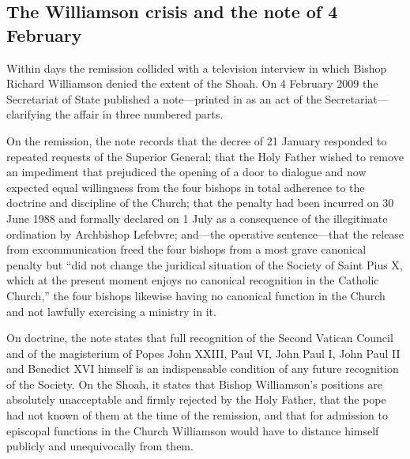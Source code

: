 
\subsection{The Williamson crisis and the note of 4 February}

Within days the remission collided with a television interview in which
Bishop Richard Williamson denied the extent of the Shoah. On 4 February
2009 the Secretariat of State published a note---printed in  as an act of the Secretariat---clarifying the affair in
three numbered parts.

On the remission, the note records that the decree of 21 January
responded to repeated requests of the Superior General; that the Holy
Father wished to remove an impediment that prejudiced the opening of a
door to dialogue and now expected equal willingness from the four bishops
in total adherence to the doctrine and discipline of the Church; that the
penalty had been incurred on 30 June 1988 and formally declared on 1 July
as a consequence of the illegitimate ordination by Archbishop Lefebvre;
and---the operative sentence---that the release from excommunication
freed the four bishops from a most grave canonical penalty but ``did not
change the juridical situation of the Society of Saint Pius X, which at
the present moment enjoys no canonical recognition in the Catholic
Church,'' the four bishops likewise having no canonical function in the
Church and not lawfully exercising a ministry in it.

On doctrine, the note states that full recognition of the Second Vatican
Council and of the magisterium of Popes John XXIII, Paul VI, John Paul I,
John Paul II and Benedict XVI himself is an indispensable condition of
any future recognition of the Society. On the Shoah, it states that
Bishop Williamson's positions are absolutely unacceptable and firmly
rejected by the Holy Father, that the pope had not known of them at the
time of the remission, and that for admission to episcopal functions in
the Church Williamson would have to distance himself publicly and
unequivocally from them.

